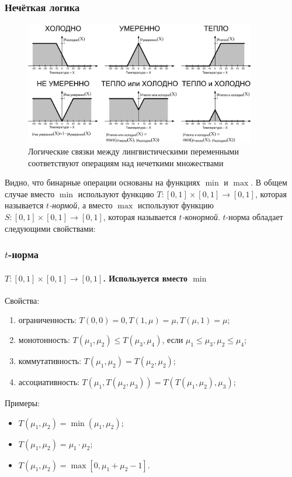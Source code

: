 \begin{frame}
    \frametitle{Нечёткая логика}
    
    \begin{figure}
        \centering
        \includegraphics[width=0.9\textwidth]{fig/fuzzyOperations}
        \caption{Логические связки между лингвистическими переменными соответствуют операциям над нечеткими множествами}
        \label{fig:fuz:fuzzyOperations}
    \end{figure} 
\end{frame}


Видно, что бинарные операции основаны на функциях $\min$ и $\max$. В общем случае вместо $\min$ используют функцию $T:[0,1]\times[0,1]\to[0,1]$, которая называется \emph{$t$-нормой}, а вместо $\max$ используют функцию $S:[0,1]\times[0,1]\to[0,1]$, которая называется \emph{$t$-конормой}. $t$-норма обладает следующими свойствами:

\begin{frame}
    \frametitle{$t$-норма}
    \framesubtitle{$T:[0,1]\times[0,1]\to[0,1]$. Используется вместо $\min$}
    
    Свойства:
    \begin{enumerate}
        \item ограниченность: $T(0,0)=0,T(1,\mu)=\mu,T(\mu,1)=\mu$;
        \item монотонность: $T(\mu_1,\mu_2)\leq T(\mu_3,\mu_4)$, если $\mu_1\leq\mu_3, \mu_2\leq\mu_4$;
        \item коммутативность: $T(\mu_1,\mu_2)=T(\mu_2,\mu_2)$;
        \item ассоциативность: $T(\mu_1,T(\mu_2, \mu_3))=T(T(\mu_1,\mu_2),\mu_3)$;
    \end{enumerate}
    
    Примеры:
    \begin{itemize}
        \item $T(\mu_1,\mu_2)=\min(\mu_1,\mu_2)$;
        \item $T(\mu_1,\mu_2)=\mu_1\cdot \mu_2$;
        \item $T(\mu_1,\mu_2)=\max[0,\mu_1+\mu_2-1]$.
    \end{itemize}
\end{frame}

